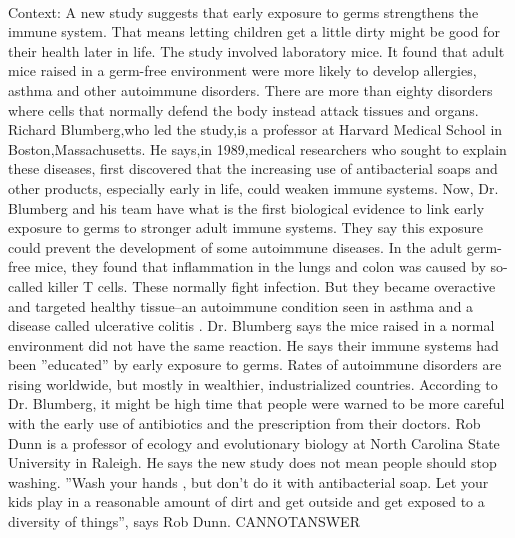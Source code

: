 \documentclass[11pt,a4paper, onecolumn]{article}
\begin{document}
\\ Context: A new study suggests that early exposure to germs strengthens the immune system. That means letting children get a little dirty might be good for their health later in life. The study involved laboratory mice. It found that adult mice raised in a germ-free environment were more likely to develop allergies, asthma and other autoimmune disorders. There are more than eighty disorders where cells that normally defend the body instead attack tissues and organs. Richard Blumberg,who led the study,is a professor at Harvard Medical School in Boston,Massachusetts. He says,in 1989,medical researchers who sought to explain these diseases, first discovered that the increasing use of antibacterial soaps and other products, especially early in life, could weaken immune systems. Now, Dr. Blumberg and his team have what is the first biological evidence to link early exposure to germs to stronger adult immune systems. They say this exposure could prevent the development of some autoimmune diseases. In the adult germ-free mice, they found that inflammation in the lungs and colon was caused by so-called killer T cells. These normally fight infection. But they became overactive and targeted healthy tissue--an autoimmune condition seen in asthma and a disease called ulcerative colitis . Dr. Blumberg says the mice raised in a normal environment did not have the same reaction. He says their immune systems had been ''educated'' by early exposure to germs. Rates of autoimmune disorders are rising worldwide, but mostly in wealthier, industrialized countries. According to Dr. Blumberg, it might be high time that people were warned to be more careful with the early use of antibiotics and the prescription from their doctors. Rob Dunn is a professor of ecology and evolutionary biology at North Carolina State University in Raleigh. He says the new study does not mean people should stop washing. ''Wash your hands , but don't do it with antibacterial soap. Let your kids play in a reasonable amount of dirt and get outside and get exposed to a diversity of things'', says Rob Dunn. CANNOTANSWER
\end{document}
